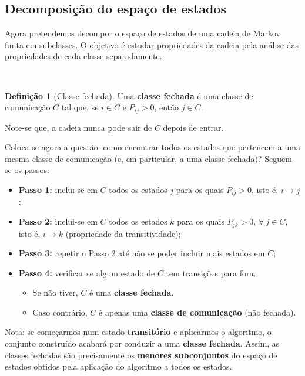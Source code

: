 \documentclass[
  11pt,
  a4paper,
]{book}
\providecommand{\tightlist}{%
  \setlength{\itemsep}{0pt}\setlength{\parskip}{0pt}}
\theoremstyle{definition}
\newtheorem{definition}{Definição}[chapter]
\theoremstyle{definition}
\theoremstyle{definition}
\theoremstyle{definition}
\theoremstyle{remark}
\begin{document}
\subsection{Decomposição do espaço de estados}\label{decomposicao-do-espaco-de-estados}

Agora pretendemos decompor o espaço de estados de uma cadeia de Markov finita em subclasses. O objetivo é estudar propriedades da cadeia pela análise das propriedades de cada classe separadamente.

\(\,\)

\begin{definition}[Classe fechada]
Uma \textbf{classe fechada} é uma classe de comunicação \(C\) tal que, se \(i \in C\) e \(P_{ij} > 0\), então \(j \in C\).

Note-se que, a cadeia nunca pode sair de \(C\) depois de entrar.
\end{definition}

Coloca-se agora a questão: como encontrar todos os estados que pertencem a uma mesma classe de comunicação (e, em particular, a uma classe fechada)? Seguem-se os passos:

\begin{itemize}
\item
  \textbf{Passo 1:} inclui-se em \(C\) todos os estados \(j\) para os quais \(P_{ij}>0\), isto é, \(i \longrightarrow j\);
\item
  \textbf{Passo 2:} inclui-se em \(C\) todos os estados \(k\) para os quais \(P_{jk}>0\), \(\forall ~j \in C\), isto é, \(i \longrightarrow k\) (propriedade da transitividade);
\item
  \textbf{Passo 3:} repetir o Passo 2 até não se poder incluir mais estados em \(C\);
\item
  \textbf{Passo 4:} verificar se algum estado de \(C\) tem transições para fora.

  \begin{itemize}
  \tightlist
  \item
    Se não tiver, \(C\) é uma \textbf{classe fechada}.\\
  \item
    Caso contrário, \(C\) é apenas uma \textbf{classe de comunicação} (não fechada).
  \end{itemize}
\end{itemize}

Nota: se começarmos num estado \textbf{transitório} e aplicarmos o algoritmo, o conjunto construído acabará por conduzir a uma \textbf{classe fechada}. Assim, as classes fechadas são precisamente os \textbf{menores subconjuntos} do espaço de estados obtidos pela aplicação do algoritmo a todos os estados.
\end{document}
